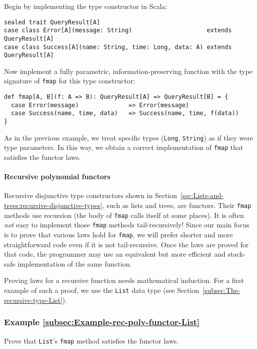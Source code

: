 Begin by implementing the type constructor in Scala:
\begin{lstlisting}
sealed trait QueryResult[A]
case class Error[A](message: String)                     extends QueryResult[A]
case class Success[A](name: String, time: Long, data: A) extends QueryResult[A]
\end{lstlisting}
Now implement a fully parametric, information-preserving function
with the type signature of \lstinline!fmap! for this type constructor:
\begin{lstlisting}
def fmap[A, B](f: A => B): QueryResult[A] => QueryResult[B] = {
  case Error(message)              => Error(message)
  case Success(name, time, data)   => Success(name, time, f(data))
}
\end{lstlisting}
As in the previous example, we treat specific types (\lstinline!Long!,
\lstinline!String!) as if they were type parameters. In this way,
we obtain a correct implementation of \lstinline!fmap! that satisfies
the functor laws.

\paragraph{Recursive polynomial functors}

Recursive disjunctive type constructors shown in Section~\ref{sec:Lists-and-trees:recursive-disjunctive-types},
such as lists and trees, are functors. Their \lstinline!fmap! methods
use recursion (the body of \lstinline!fmap! calls itself at some
places). It is often \emph{not} easy to implement those \lstinline!fmap!
methods tail-recursively! Since our main focus is to prove that various
laws hold for \lstinline!fmap!, we will prefer shorter and more straightforward
code even if it is not tail-recursive. Once the laws are proved for
that code, the programmer may use an equivalent but more efficient
and stack-safe implementation of the same function.

Proving laws for a recursive function needs mathematical induction.
For a first example of such a proof, we use the \lstinline!List!
data type (see Section~\ref{subsec:The-recursive-type-List}). 

\subsubsection{Example \label{subsec:Example-rec-poly-functor-List}\ref{subsec:Example-rec-poly-functor-List}}

Prove that \lstinline!List!\textsf{'}s \lstinline!fmap! method satisfies
the functor laws.

